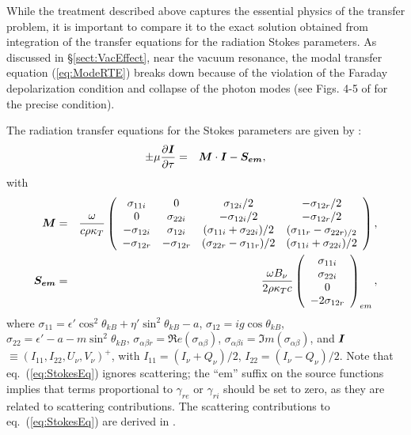 \documentclass[useAMS,onecolumn,usenatbib,usegraphicx]{mn2e}
\begin{document}
While the treatment described above captures the essential physics of the transfer 
problem, it is important to compare it to the exact solution obtained from integration 
of the transfer equations for the radiation Stokes parameters.
As discussed in \S\ref{sect:VacEffect}, near the vacuum resonance, the modal transfer equation (\ref{eq:ModeRTE}) 
breaks down because of the violation of the Faraday depolarization condition and collapse 
of the photon modes (see Figs. 4-5 of \citet[][]{LaiHo03a} for the precise condition).  

The radiation transfer equations for the Stokes parameters are given by \citep[][]{LaiHo03a}:
\begin{eqnarray}
\label{eq:StokesEq}
\pm\mu{\partial{\mbox{\boldmath{$I$}}}\over \partial\tau} & = &
\mbox{\boldmath{$M$}} \cdot \mbox{\boldmath{$I$}}-\mbox{\boldmath{$S_{em}$}},
\end{eqnarray}
with
\begin{eqnarray}
\mbox{\boldmath{$M$}} & = & {\omega\over c\rho\kappa_T}\left(
\begin{array}{cccc}
\sigma_{11i} & 0 & \sigma_{12i}/2 & -\sigma_{12r}/2\\
0 & \sigma_{22i} & -\sigma_{12i}/2 & -\sigma_{12r}/2\\
-\sigma_{12i} & \sigma_{12i} & (\sigma_{11i}+\sigma_{22i})/2 & (\sigma_{11r}-\sigma_{22r)/2}\\
-\sigma_{12r} & -\sigma_{12r} & (\sigma_{22r}-\sigma_{11r})/2 & (\sigma_{11i}+\sigma_{22i})/2
\end{array}
\right),\\
\mbox{\boldmath{$S_{em}$}} & = & {\omega B_{\nu}\over 2\rho\kappa_T c}\left(
\begin{array}{c}
\sigma_{11i}\\
\sigma_{22i}\\
0\\
-2\sigma_{12r}
\end{array}
\right)_{em},
\end{eqnarray}
where $\sigma_{11}=\epsilon'\cos^2\theta_{kB}+\eta'\sin^2\theta_{kB}-a$, 
$\sigma_{12}=ig\cos\theta_{kB}$, $\sigma_{22}=\epsilon'-a-m\sin^2\theta_{kB}$, 
$\sigma_{\alpha\beta r}=\Re e(\sigma_{\alpha\beta})$, $\sigma_{\alpha\beta i}=\Im m(\sigma_{\alpha\beta})$, and
$\mbox{\boldmath{$I$}}$$\equiv (I_{11},I_{22},U_{\nu},V_{\nu})^+$, with $I_{11}=(I_{\nu}+Q_{\nu})/2$, $I_{22}=(I_{\nu}-Q_{\nu})/2$.
Note that 
eq.~(\ref{eq:StokesEq}) ignores scattering; the ``em'' suffix on the source functions implies 
that terms proportional to $\gamma_{re}$ or $\gamma_{ri}$ should be set to zero, as they are related to 
scattering contributions.  The scattering contributions to eq.~(\ref{eq:StokesEq}) are derived in 
\citet[][]{LaiHo03a}.
\end{document}
